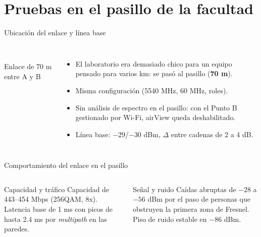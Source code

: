 \renewcommand{\seccorta}{Pruebas}
\section{Pruebas en el pasillo de la facultad}

\begin{frame}{Ubicación del enlace y línea base}
  \begin{columns}[c]
    \centering
    \\
    {\scriptsize Enlace de 70 m entre A y B}
    \small
    \begin{itemize}
      \item El laboratorio era demasiado chico para un equipo pensado para varios km:
            se pasó al pasillo (\textbf{70 m}).
      \item Misma configuración (5540 MHz, 60 MHz, roles).
      \item Sin análisis de espectro en el pasillo: con el Punto B gestionado por Wi-Fi,
            airView queda deshabilitado.
      \item Línea base: $-29$/$-30$ dBm, $\Delta$ entre cadenas de 2 a 4 dB.
    \end{itemize}
  \end{columns}
\end{frame}

\begin{frame}{Comportamiento del enlace en el pasillo}
  \begin{columns}[c]
    \centering
    \small
    \begin{block}{Capacidad y tráfico}
      Capacidad de 443--454 Mbps (256QAM, 8x). Latencia base de 1 ms con picos de hasta
      2.4 ms por \emph{multipath} en las paredes.
    \end{block}
    \begin{block}{Señal y ruido}
      Caídas abruptas de $-28$ a $-56$ dBm por el paso de personas que obstruyen la primera
      zona de Fresnel. Piso de ruido estable en $-86$ dBm.
    \end{block}
  \end{columns}
\end{frame}

